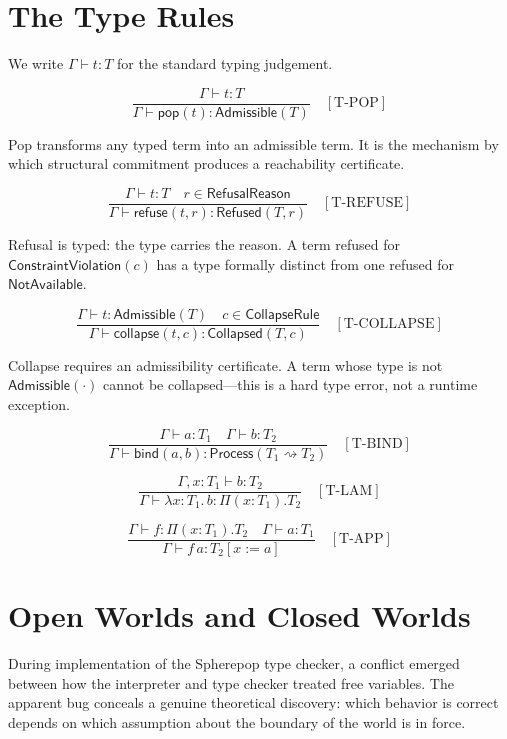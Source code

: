 \documentclass[12pt, a4paper, openany]{book}
\theoremstyle{plain}
\theoremstyle{definition}
\theoremstyle{remark}
\newcommand{\Adm}{\mathsf{Admissible}}
\newcommand{\Rfsd}{\mathsf{Refused}}
\newcommand{\Col}{\mathsf{Collapsed}}
\newcommand{\Proc}{\mathsf{Process}}
\begin{document}
\section{The Type Rules}

We write $\Gamma \vdash t : T$ for the standard typing judgement.

\[
\frac{\Gamma \vdash t : T}{\Gamma \vdash \mathsf{pop}(t) : \Adm(T)} \quad [\mathrm{T\text{-}POP}]
\]

Pop transforms any typed term into an admissible term. It is the mechanism by
which structural commitment produces a reachability certificate.

\[
\frac{\Gamma \vdash t : T \quad r \in \mathsf{RefusalReason}}{\Gamma \vdash \mathsf{refuse}(t, r) : \Rfsd(T, r)} \quad [\mathrm{T\text{-}REFUSE}]
\]

Refusal is typed: the type carries the reason. A term refused for
$\mathsf{ConstraintViolation}(c)$ has a type formally distinct from one refused
for $\mathsf{NotAvailable}$.

\[
\frac{\Gamma \vdash t : \Adm(T) \quad c \in \mathsf{CollapseRule}}{\Gamma \vdash \mathsf{collapse}(t, c) : \Col(T, c)} \quad [\mathrm{T\text{-}COLLAPSE}]
\]

Collapse requires an admissibility certificate. A term whose type is not
$\Adm(\cdot)$ cannot be collapsed---this is a hard type error, not a runtime
exception.

\[
\frac{\Gamma \vdash a : T_1 \quad \Gamma \vdash b : T_2}{\Gamma \vdash \mathsf{bind}(a, b) : \Proc(T_1 \rightsquigarrow T_2)} \quad [\mathrm{T\text{-}BIND}]
\]

\[
\frac{\Gamma, x : T_1 \vdash b : T_2}{\Gamma \vdash \lambda x : T_1.\, b : \Pi(x : T_1).T_2} \quad [\mathrm{T\text{-}LAM}]
\]

\[
\frac{\Gamma \vdash f : \Pi(x : T_1).T_2 \quad \Gamma \vdash a : T_1}{\Gamma \vdash f\, a : T_2[x := a]} \quad [\mathrm{T\text{-}APP}]
\]

\section{Open Worlds and Closed Worlds}

During implementation of the Spherepop type checker, a conflict emerged between
how the interpreter and type checker treated free variables. The apparent bug
conceals a genuine theoretical discovery: which behavior is correct depends on
which assumption about the boundary of the world is in force.
\end{document}
